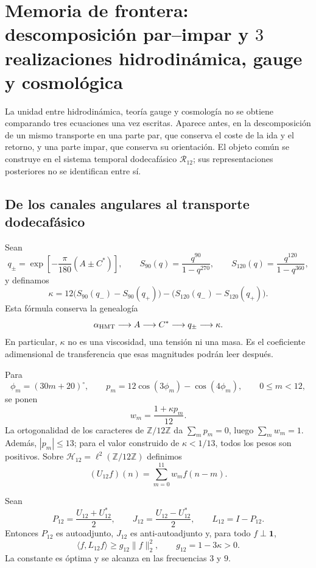 \chapter{Memoria de frontera: descomposición par--impar y \(3\) realizaciones hidrodinámica, gauge y cosmológica}
\label{chap:memoria-tres-lecturas-rev6}

La unidad entre hidrodinámica, teoría gauge y cosmología no se obtiene
comparando tres ecuaciones una vez escritas.  Aparece antes, en la
descomposición de un mismo transporte en una parte par, que conserva el coste
de la ida y el retorno, y una parte impar, que conserva su orientación.  El
objeto común se construye en el sistema temporal dodecafásico \(\mathcal R_{12}\); sus representaciones
posteriores no se identifican entre sí.

\section{De los canales angulares al transporte dodecafásico}

Sean
\[
 q_\pm=\exp\!\left[-\frac{\pi}{180}(A\pm C^\ast)\right],
 \qquad
 S_{90}(q)=\frac{q^{90}}{1-q^{270}},
 \qquad
 S_{120}(q)=\frac{q^{120}}{1-q^{360}},
\]
y definamos
\[
 \kappa
 =12\bigl(S_{90}(q_-)-S_{90}(q_+)\bigr)
 -\bigl(S_{120}(q_-)-S_{120}(q_+)\bigr).
\]
Esta fórmula conserva la genealogía
\[
 \alpha_{\rm HMT}\longrightarrow A
 \longrightarrow C^\ast\longrightarrow q_\pm
 \longrightarrow\kappa.
\]
En particular, \(\kappa\) no es una viscosidad, una tensión ni una masa.  Es
el coeficiente adimensional de transferencia que esas magnitudes podrán leer
después.

Para
\[
 \phi_m=(30m+20)^\circ,\qquad
 p_m=12\cos(3\phi_m)-\cos(4\phi_m),
 \qquad 0\leq m<12,
\]
se ponen
\[
 w_m=\frac{1+\kappa p_m}{12}.
\]
La ortogonalidad de los caracteres de
\(\mathbb Z/12\mathbb Z\) da
\(\sum_m p_m=0\), luego \(\sum_mw_m=1\).  Además,
\(|p_m|\leq13\); para el valor construido de \(\kappa<1/13\), todos los
pesos son positivos.  Sobre
\(\mathcal H_{12}=\ell^2(\mathbb Z/12\mathbb Z)\) definimos
\[
 (U_{12}f)(n)=\sum_{m=0}^{11}w_mf(n-m).
\]

\begin{theorem}
\label{thm:reserva-dodecafasica-rev6}
Sean
\[
 P_{12}=\frac{U_{12}+U_{12}^{\ast}}2,\qquad
 J_{12}=\frac{U_{12}-U_{12}^{\ast}}2,\qquad
 L_{12}=I-P_{12}.
\]
Entonces \(P_{12}\) es autoadjunto, \(J_{12}\) es
anti-autoadjunto y, para todo \(f\perp\mathbf1\),
\[
 \boxed{\;
 \langle f,L_{12}f\rangle
 \geq g_{12}\|f\|_2^2,\qquad
 g_{12}=1-3\kappa>0.
 \;}
\]
La constante es óptima y se alcanza en las frecuencias \(3\) y \(9\).
\end{theorem}

